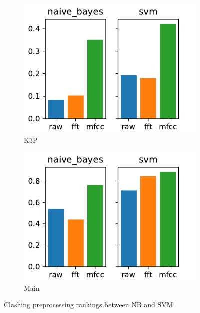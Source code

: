 \documentclass[../main.tex]{subfiles}
\begin{document}
\begin{figure}
    \centering
    \begin{subfigure}[b]{0.49\textwidth}
        \includegraphics[width=\textwidth]{figures/plots/model_comparison/custom_naive_bayes_svm_k3p.pdf}
        \caption{K3P}
        \label{fig:selective_model_comparison_naive_bayes_svm_k3p}
    \end{subfigure}
    \begin{subfigure}[b]{0.49\textwidth}
        \includegraphics[width=\textwidth]{figures/plots/model_comparison/custom_naive_bayes_svm_main.pdf}
        \caption{Main}
        \label{fig:selective_model_comparison_naive_bayes_svm_main}
    \end{subfigure}
    \caption{Clashing preprocessing rankings between NB and SVM}
    \label{fig:selective_model_comparison_naive_bayes_svm}
\end{figure}
\end{document}
